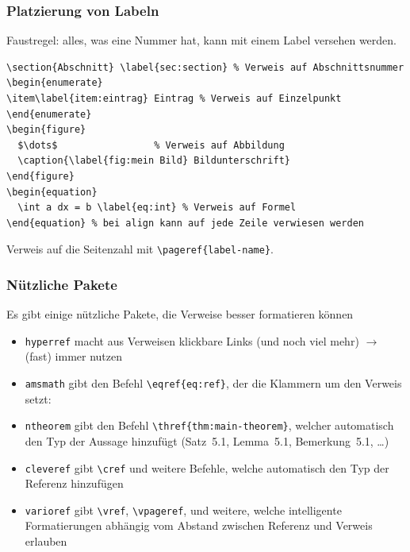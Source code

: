 \begin{frame}[fragile]
  \frametitle{Platzierung von Labeln}

  \onslide<+->

  Faustregel: alles, was eine Nummer hat, kann mit einem Label versehen werden.

  \onslide<+->
\begin{lstlisting}
\section{Abschnitt} \label{sec:section} % Verweis auf Abschnittsnummer
\begin{enumerate}
\item\label{item:eintrag} Eintrag % Verweis auf Einzelpunkt
\end{enumerate}
\begin{figure}
  $\dots$                 % Verweis auf Abbildung
  \caption{\label{fig:mein Bild} Bildunterschrift}
\end{figure}
\begin{equation}
  \int a dx = b \label{eq:int} % Verweis auf Formel
\end{equation} % bei align kann auf jede Zeile verwiesen werden
\end{lstlisting}

  \onslide<+->

  Verweis auf die Seitenzahl mit \lstinline!\pageref{label-name}!.

\end{frame}

\begin{frame}[fragile]
  \frametitle{Nützliche Pakete}

  \onslide<+->

  Es gibt einige nützliche Pakete, die Verweise besser formatieren können

  \begin{itemize}
    \item<+-> \lstinline!hyperref! macht aus Verweisen klickbare Links (und noch viel mehr) $\to$ (fast) immer nutzen
    \item<+-> \lstinline!amsmath! gibt den Befehl \lstinline!\eqref{eq:ref}!, der die Klammern um den Verweis setzt: %
    \item<+-> \lstinline!ntheorem! gibt den Befehl \lstinline!\thref{thm:main-theorem}!,
      welcher automatisch den Typ der Aussage hinzufügt (Satz~5.1, Lemma~5.1, Bemerkung~5.1,
      \dots)
    \item<+-> \lstinline!cleveref! gibt \lstinline!\cref! und weitere Befehle, welche
      automatisch den Typ der Referenz hinzufügen
    \item<+-> \lstinline!varioref! gibt \lstinline!\vref!, \lstinline!\vpageref!, und
      weitere, welche intelligente Formatierungen abhängig vom Abstand zwischen Referenz und
      Verweis erlauben
  \end{itemize}

\end{frame}

